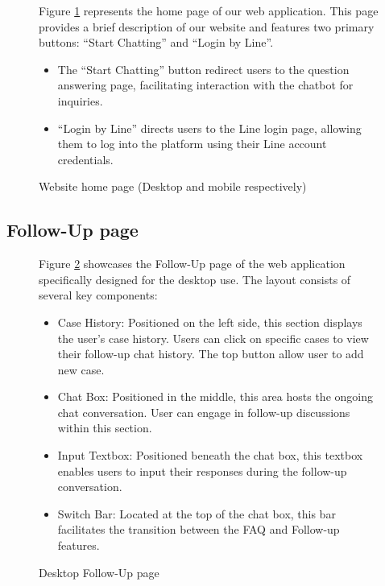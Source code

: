 \documentclass[12pt,oneside,openright,a4paper]{cpe-english-project}
\begin{document}
\begin{figure}[!h]
      \caption{Website home page (Desktop and mobile respectively)}\label{fig:HomePage}
      \begin{justify}
        \qquad Figure \ref{fig:HomePage} represents the home page of our web application. This page provides a brief description of our website and features two primary buttons: “Start Chatting” and “Login by Line”.
        \begin{itemize}
          \item The “Start Chatting” button redirect users to the question answering page, facilitating interaction with the chatbot for inquiries.
          \item “Login by Line” directs users to the Line login page, allowing them to log into the platform using their Line account credentials.
        \end{itemize}
      \end{justify}
    \end{figure}
    \newpage

    \subsection{Follow-Up page}
      \begin{figure}[!h]
        \centering
        \caption{Desktop Follow-Up page}\label{fig:Desk_Follow}
        \begin{justify}
          \qquad Figure \ref{fig:Desk_Follow} showcases the Follow-Up page of the web application specifically designed for the desktop use. The layout consists of several key components: \par
          \begin{itemize}
            \item Case History: Positioned on the left side, this section displays the user’s case history. Users can click on specific cases to view their follow-up chat history. The top button allow user to add new case.
            \item Chat Box: Positioned in the middle, this area hosts the ongoing chat conversation. User can engage in follow-up discussions within this section. 
            \item Input Textbox: Positioned beneath the chat box, this textbox enables users to input their responses during the follow-up conversation. 
            \item Switch Bar: Located at the top of the chat box, this bar facilitates the transition between the FAQ and Follow-up features.
          \end{itemize}
        \end{justify}
      \end{figure}
\end{document}
